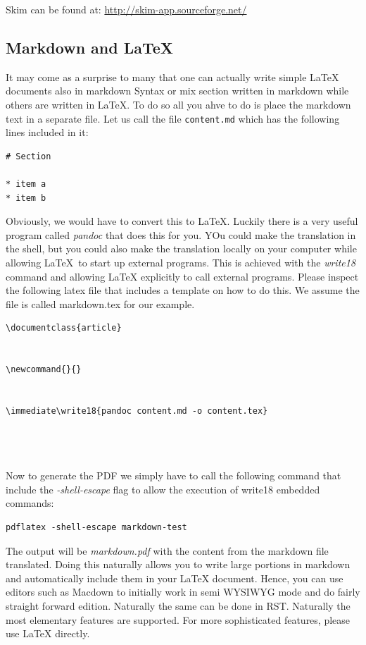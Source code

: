 Skim can be found at: \url{http://skim-app.sourceforge.net/}

\subsection{Markdown and \LaTeX}

It may come as a surprise to many that one can actually write simple
LaTeX documents also in markdown Syntax or mix section written in
markdown while others are written in LaTeX. To do so all you ahve to
do is place the markdown text in a separate file. Let us call the file 
\verb|content.md| which has the following lines included in it:

\begin{verbatim}
# Section

* item a
* item b
\end{verbatim}

Obviously, we would have to convert this to LaTeX. Luckily there is a
very useful program called \textit{pandoc} that does this for you. YOu
could make the translation in the shell, but you could also make the
translation locally on your computer while allowing \LaTeX~to start up
external programs. This is achieved with the \textit{write18} command and
allowing LaTeX explicitly to call external programs. Please inspect
the following latex file that includes a template on how to do
this. We assume the file is called markdown.tex for our example.

\begin{verbatim}
\documentclass{article}


\newcommand{}{}


\immediate\write18{pandoc content.md -o content.tex}




\end{verbatim}

Now to generate the PDF we simply have to call the following command
that include the \textit{-shell-escape} flag to allow the execution of
write18 embedded commands:

\begin{verbatim}
pdflatex -shell-escape markdown-test
\end{verbatim}

The output will be \textit{markdown.pdf} with the content from the
markdown file translated. Doing this naturally allows you to write
large portions in markdown and automatically include them in your
LaTeX document. Hence, you can use editors such as Macdown to initially
work in semi WYSIWYG mode and do fairly straight forward
edition. Naturally the same can be done in RST. Naturally the most
elementary features are supported. For more sophisticated features,
please use LaTeX directly.


